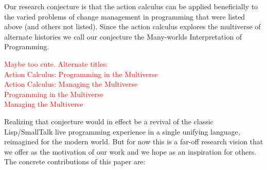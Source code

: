 \documentclass[english,submission]{programming}
\theoremstyle{definition}
\begin{document}
Our research conjecture is that the action calculus can be applied beneficially to the varied problems of change management in programming that were listed above (and others not listed). Since the action calculus explores the multiverse of alternate histories we call our conjecture the Many-worlds Interpretation of Programming.

\noindent\textcolor{red}{Maybe too cute. Alternate titles:\\
Action Calculus: Programming in the Multiverse\\
Action Calculus: Managing the Multiverse\\
Programming in the Multiverse\\
Managing the Multiverse\\
}

Realizing that conjecture would in effect be a revival of the classic Lisp/SmallTalk live programming experience in a single unifying language, reimagined for the modern world. But for now this is a far-off research vision that we offer
as the motivation of our work and we hope as an inspiration for others. The concrete contributions of this paper are:
\end{document}
